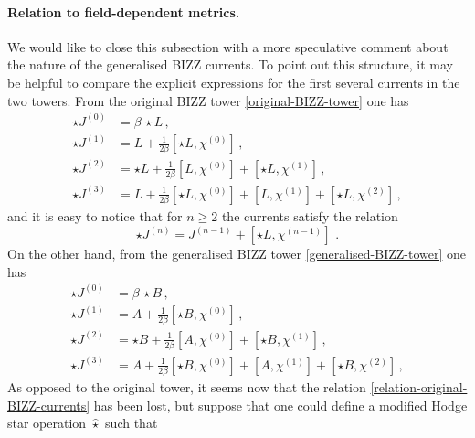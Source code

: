 \documentclass[12pt]{article}
\numberwithin{equation}{section}
\begin{document}
\paragraph{Relation to field-dependent metrics.}
We would like to close this subsection with a more speculative comment about the nature of the generalised BIZZ currents. To point out this structure, it may be helpful to compare the explicit expressions for the first several currents in the two towers. From the original BIZZ tower \eqref{original-BIZZ-tower} one has
\begin{equation}
\begin{aligned}
\star J^{(0)}&=\beta \, \star L \, ,
\\
\star J^{(1)}&= L+\tfrac{1}{2\beta}[\star L,\chi^{(0)}] \, ,
\\
\star J^{(2)}&=\star L+\tfrac{1}{2\beta}[ L,\chi^{(0)}]+[\star L,\chi^{(1)}] \, ,
\\
\star J^{(3)}&= L+\tfrac{1}{2\beta}[ \star L,\chi^{(0)}]+[ L,\chi^{(1)}]+[\star L,\chi^{(2)}] \, ,
\end{aligned}
\end{equation}
and it is easy to notice that for $n\geq 2$ the currents satisfy the relation
\begin{equation}\label{relation-original-BIZZ-currents}
\star J^{(n)}= J^{(n-1)}+[\star L,\chi^{(n-1)}] \,\, .
\end{equation}
On the other hand, from the generalised BIZZ tower \eqref{generalised-BIZZ-tower} one has
\begin{equation}
\begin{aligned}
\star J^{(0)}&=\beta \, \star B \, ,
\\
\star J^{(1)}&=  A + \tfrac{1}{2\beta}[\star B,\chi^{(0)}] \, ,
\\
\star J^{(2)}&=\star B+\tfrac{1}{2\beta}[ A,\chi^{(0)}]+[\star B,\chi^{(1)}] \, ,
\\
\star J^{(3)}&= A + \tfrac{1}{2\beta}[\star B,\chi^{(0)}]+[ A,\chi^{(1)}]+[\star B,\chi^{(2)}] \, ,
\end{aligned}
\end{equation}
As opposed to the original tower, it seems now that the relation \eqref{relation-original-BIZZ-currents} has been lost, but suppose that one could define a modified Hodge star operation $\hat{\star}$ such that
\end{document}
